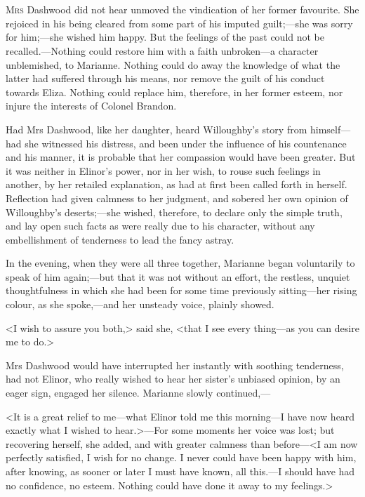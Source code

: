 \chapter[Chapter \thechapter]{}
\lettrine[lraise=0.3]{M}{rs} Dashwood did not hear unmoved the vindication of her former favourite. She rejoiced in his being cleared from some part of his imputed guilt;—she was sorry for him;—she wished him happy. But the feelings of the past could not be recalled.—Nothing could restore him with a faith unbroken—a character unblemished, to Marianne. Nothing could do away the knowledge of what the latter had suffered through his means, nor remove the guilt of his conduct towards Eliza. Nothing could replace him, therefore, in her former esteem, nor injure the interests of Colonel Brandon.

Had Mrs Dashwood, like her daughter, heard Willoughby's story from himself—had she witnessed his distress, and been under the influence of his countenance and his manner, it is probable that her compassion would have been greater. But it was neither in Elinor's power, nor in her wish, to rouse such feelings in another, by her retailed explanation, as had at first been called forth in herself. Reflection had given calmness to her judgment, and sobered her own opinion of Willoughby's deserts;—she wished, therefore, to declare only the simple truth, and lay open such facts as were really due to his character, without any embellishment of tenderness to lead the fancy astray.

In the evening, when they were all three together, Marianne began voluntarily to speak of him again;—but that it was not without an effort, the restless, unquiet thoughtfulness in which she had been for some time previously sitting—her rising colour, as she spoke,—and her unsteady voice, plainly showed.

<I wish to assure you both,> said she, <that I see every thing—as you can desire me to do.>

Mrs Dashwood would have interrupted her instantly with soothing tenderness, had not Elinor, who really wished to hear her sister's unbiased opinion, by an eager sign, engaged her silence. Marianne slowly continued,—

<It is a great relief to me—what Elinor told me this morning—I have now heard exactly what I wished to hear.>—For some moments her voice was lost; but recovering herself, she added, and with greater calmness than before—<I am now perfectly satisfied, I wish for no change. I never could have been happy with him, after knowing, as sooner or later I must have known, all this.—I should have had no confidence, no esteem. Nothing could have done it away to my feelings.>

